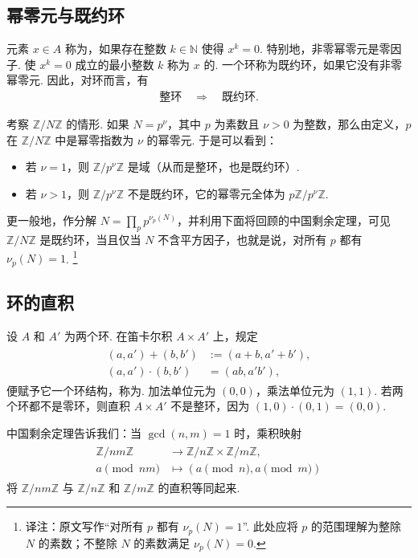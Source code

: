 \subsection{幂零元与既约环}\label{sec:galois-1-2-4}
元素 $x\in A$ 称为，如果存在整数 $k\in\mathbb N$ 使得 $x^k=0$.
特别地，非零幂零元是零因子.
使 $x^k=0$ 成立的最小整数 $k$ 称为 $x$ 的.
一个环称为既约环，如果它没有非零幂零元.
因此，对环而言，有
\begin{align*}
\text{整环}\quad\Longrightarrow\quad\text{既约环}.
\end{align*}
\begin{example*}
考察 $\mathbb Z/N\mathbb Z$ 的情形.
如果 $N=p^\nu$，其中 $p$ 为素数且 $\nu>0$ 为整数，那么由定义，$p$ 在 $\mathbb Z/N\mathbb Z$ 中是幂零指数为 $\nu$ 的幂零元.
于是可以看到：
\begin{itemize}
\item 若 $\nu=1$，则 $\mathbb Z/p^\nu\mathbb Z$ 是域（从而是整环，也是既约环）.
\item 若 $\nu>1$，则 $\mathbb Z/p^\nu\mathbb Z$ 不是既约环，它的幂零元全体为 $p\mathbb Z/p^\nu\mathbb Z$.
\end{itemize}
更一般地，作分解 $N=\prod_p p^{\nu_p(N)}$，并利用下面将回顾的中国剩余定理，可见 $\mathbb Z/N\mathbb Z$ 是既约环，当且仅当 $N$ 不含平方因子，也就是说，对所有 $p$ 都有 $\nu_p(N)=1$.
\footnote{译注：原文写作``对所有 $p$ 都有 $\nu_p(N)=1$''. 此处应将 $p$ 的范围理解为整除 $N$ 的素数；不整除 $N$ 的素数满足 $\nu_p(N)=0$.}
\end{example*}

\subsection{环的直积}\label{sec:galois-1-2-5}
设 $A$ 和 $A'$ 为两个环. 在笛卡尔积 $A\times A'$ 上，规定
\begin{align*}
\begin{aligned}
(a,a')+(b,b')&:=(a+b,a'+b'),\\
(a,a')\cdot(b,b')&=(ab,a'b'),
\end{aligned}
\end{align*}
便赋予它一个环结构，称为.
加法单位元为 $(0,0)$，乘法单位元为 $(1,1)$.
若两个环都不是零环，则直积 $A\times A'$ 不是整环，因为 $(1,0)\cdot(0,1)=(0,0)$.
\begin{example*}
中国剩余定理告诉我们：当 $\gcd(n,m)=1$ 时，乘积映射
\begin{align*}
\begin{aligned}
\mathbb Z/nm\mathbb Z&\longrightarrow\mathbb Z/n\mathbb Z\times\mathbb Z/m\mathbb Z,\\
a\pmod{nm}&\longmapsto(a\pmod n,a\pmod m)
\end{aligned}
\end{align*}
将 $\mathbb Z/nm\mathbb Z$ 与 $\mathbb Z/n\mathbb Z$ 和 $\mathbb Z/m\mathbb Z$ 的直积等同起来.
\end{example*}

